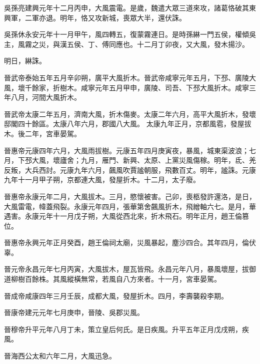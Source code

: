 \begin{pinyinscope}
 吳孫亮建興元年十二月丙申，大風震電。是歲，魏遣大眾三道來攻，諸葛恪破其東興軍，二軍亦退。明年，恪又攻新城，喪眾大半，還伏誅。



 吳孫休永安元年十一月甲午，風四轉五，復蒙霧連日。是時孫綝一門五侯，權傾吳主，風霧之災，與漢五侯、丁、傅同應也。十二月丁卯夜，又大風，發木揚沙。



 明日，綝誅。



 晉武帝泰始五年五月辛卯朔，廣平大風折木。晉武帝咸寧元年五月，下邳、廣陵大風，壞千餘家，折樹木。咸寧元年五月甲申，廣陵、司吾、下邳大風折木。咸寧三年八月，河間大風折木。



 晉武帝太康二年五月，濟南大風，折木傷麥。太康二年六月，高平大風折木，發壞邸閣四十餘區。太康八年六月，郡國八大風。
 太康九年正月，京都風雹，發屋拔木。後二年，宮車晏駕。



 晉惠帝元康四年六月，大風雨拔樹。元康五年四月庚寅夜，暴風，城東渠波浪；七月，下邳大風，壞廬舍；九月，雁門、新興、太原、上黨災風傷稼。明年，氐、羌反叛，大兵西討。元康九年六月，飆風吹賈謐朝服，飛數百丈。明年，謐誅。元康九年十一月甲子朔，京都連大風，發屋折木。十二月，太子廢。



 晉惠帝永康元年二月，大風拔木。三月，愍懷被害。己卯，喪柩發許還洛，是日，大風雷電，幃蓋飛裂。永康元年四月，張華第舍飆風折木，飛繒軸六七。是月，華遇害。永康元年十一月戊子朔，大風從西北來，折木飛石。明年正月，趙王倫篡位。



 晉惠帝永興元年正月癸酉，趙王倫祠太廟，災風暴起，塵沙四合。其年四月，倫伏辜。



 晉元帝永昌元年七月丙寅，大風拔木，屋瓦皆飛。永昌元年八月，暴風壞屋，拔御道柳樹百餘株。其風縱橫無常，若風自八方來者。十一月，宮車晏駕。



 晉成帝咸康四年三月壬辰，成都大風，發屋折木。四月，李壽襲殺李期。



 晉康帝建元元年七月庚申，晉陵、吳郡災風。



 晉穆帝升平元年八月丁未，策立皇后何氏。是日疾風。升平五年正月戊戌朔，疾風。



 晉海西公太和六年二月，大風迅急。




\end{pinyinscope}
